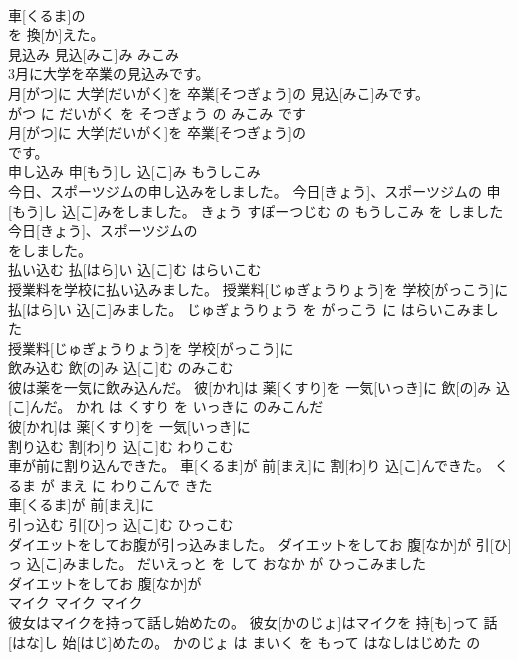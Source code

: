\documentclass[8pt]{extreport}
\begin{document}
\begin{CJK}{UTF8}{min}
\\	車[くるま]の
\\	を 換[か]えた。			
\\	見込み	見込[みこ]み	みこみ	
\\	3月に大学を卒業の見込みです。	
\\	月[がつ]に 大学[だいがく]を 卒業[そつぎょう]の 見込[みこ]みです。	
\\	がつ に だいがく を そつぎょう の みこみ です	
\\	月[がつ]に 大学[だいがく]を 卒業[そつぎょう]の
\\	です。			
\\	申し込み	申[もう]し 込[こ]み	もうしこみ	
\\	今日、スポーツジムの申し込みをしました。	今日[きょう]、スポーツジムの 申[もう]し 込[こ]みをしました。	きょう すぽーつじむ の もうしこみ を しました	
\\	今日[きょう]、スポーツジムの
\\	をしました。			
\\	払い込む	払[はら]い 込[こ]む	はらいこむ	
\\	授業料を学校に払い込みました。	授業料[じゅぎょうりょう]を 学校[がっこう]に 払[はら]い 込[こ]みました。	じゅぎょうりょう を がっこう に はらいこみました	
\\	授業料[じゅぎょうりょう]を 学校[がっこう]に
\\	飲み込む	飲[の]み 込[こ]む	のみこむ	
\\	彼は薬を一気に飲み込んだ。	彼[かれ]は 薬[くすり]を 一気[いっき]に 飲[の]み 込[こ]んだ。	かれ は くすり を いっきに のみこんだ	
\\	彼[かれ]は 薬[くすり]を 一気[いっき]に
\\	割り込む	割[わ]り 込[こ]む	わりこむ	
\\	車が前に割り込んできた。	車[くるま]が 前[まえ]に 割[わ]り 込[こ]んできた。	くるま が まえ に わりこんで きた	
\\	車[くるま]が 前[まえ]に
\\	引っ込む	引[ひ]っ 込[こ]む	ひっこむ	
\\	ダイエットをしてお腹が引っ込みました。	ダイエットをしてお 腹[なか]が 引[ひ]っ 込[こ]みました。	だいえっと を して おなか が ひっこみました	
\\	ダイエットをしてお 腹[なか]が
\\	マイク	マイク	マイク	
\\	彼女はマイクを持って話し始めたの。	彼女[かのじょ]はマイクを 持[も]って 話[はな]し 始[はじ]めたの。	かのじょ は まいく を もって はなしはじめた の	

\end{CJK}
\end{document}
